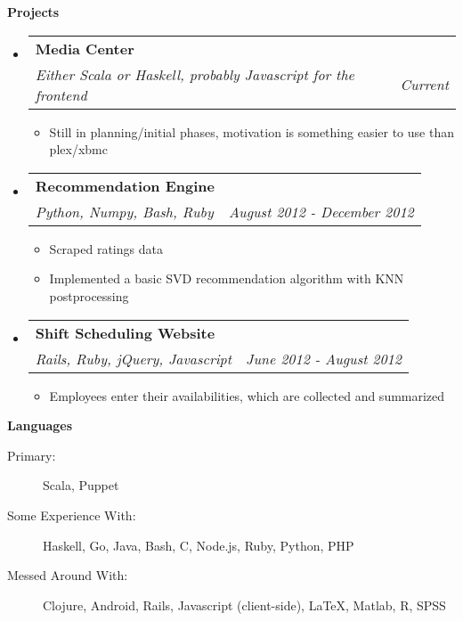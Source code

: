 \documentclass[letterpaper,11pt]{article}
\makeatletter
\newcommand{\resitem}[1]{\item #1 \vspace{-2pt}}
\newcommand{\resheading}[1]{{\large {\textbf{#1 \vphantom{p\^{E}}}}}}
\newcommand{\ressubheading}[4]{
  \begin{tabular*}{6.5in}{l@{\extracolsep{\fill}}r}
    \textbf{#1} & #2 \\
    \textit{#3} & \textit{#4} \\
  \end{tabular*}\vspace{-6pt}}
\makeatother
\begin{document}
\resheading{Projects}
\begin{itemize}
\item[]
  \ressubheading{Media Center}{}{Either Scala or Haskell, probably Javascript for the frontend}{Current}
  \begin{itemize}
    \resitem{Still in planning/initial phases, motivation is something easier to use than plex/xbmc}
  \end{itemize}
  
\item[]
  \ressubheading{Recommendation Engine}{}{Python, Numpy, Bash, Ruby}{August 2012 - December 2012}
  \begin{itemize}
    \resitem{Scraped ratings data}
    \resitem{Implemented a basic SVD recommendation algorithm with KNN postprocessing}
  \end{itemize}
  
\item[]
  \ressubheading{Shift Scheduling Website}{}{Rails, Ruby, jQuery, Javascript}{June 2012 - August 2012}
  \begin{itemize}
    \resitem{Employees enter their availabilities, which are collected and summarized}
  \end{itemize}
  
\end{itemize}

\resheading{Languages}

\begin{description}
\item[Primary:]
  Scala, Puppet
\item[Some Experience With:]
  Haskell, Go, Java, Bash, C, Node.js, Ruby, Python, PHP
\item[Messed Around With:]
  Clojure, Android, Rails, Javascript (client-side), \LaTeX, Matlab, R, SPSS
\end{description}
\end{document}
